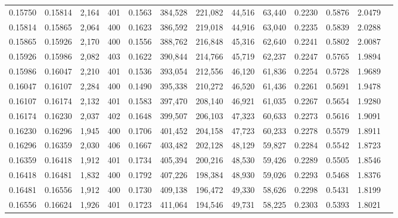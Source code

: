\begin{tabular}{rrrrrrrrrrrrr}
0.15750 & 0.15814 & 2,164 & 401 &                                     0.1563 & 384,528 & 221,082 &  44,516 &  63,440 & 0.2230 & 0.5876 & 2.0479 \\
0.15814 & 0.15865 & 2,064 & 400 &                                     0.1623 & 386,592 & 219,018 &  44,916 &  63,040 & 0.2235 & 0.5839 & 2.0288 \\
0.15865 & 0.15926 & 2,170 & 400 &                                     0.1556 & 388,762 & 216,848 &  45,316 &  62,640 & 0.2241 & 0.5802 & 2.0087 \\
0.15926 & 0.15986 & 2,082 & 403 &                                     0.1622 & 390,844 & 214,766 &  45,719 &  62,237 & 0.2247 & 0.5765 & 1.9894 \\
0.15986 & 0.16047 & 2,210 & 401 &                                     0.1536 & 393,054 & 212,556 &  46,120 &  61,836 & 0.2254 & 0.5728 & 1.9689 \\
0.16047 & 0.16107 & 2,284 & 400 &                                     0.1490 & 395,338 & 210,272 &  46,520 &  61,436 & 0.2261 & 0.5691 & 1.9478 \\
0.16107 & 0.16174 & 2,132 & 401 &                                     0.1583 & 397,470 & 208,140 &  46,921 &  61,035 & 0.2267 & 0.5654 & 1.9280 \\
0.16174 & 0.16230 & 2,037 & 402 &                                     0.1648 & 399,507 & 206,103 &  47,323 &  60,633 & 0.2273 & 0.5616 & 1.9091 \\
0.16230 & 0.16296 & 1,945 & 400 &                                     0.1706 & 401,452 & 204,158 &  47,723 &  60,233 & 0.2278 & 0.5579 & 1.8911 \\
0.16296 & 0.16359 & 2,030 & 406 &                                     0.1667 & 403,482 & 202,128 &  48,129 &  59,827 & 0.2284 & 0.5542 & 1.8723 \\
0.16359 & 0.16418 & 1,912 & 401 &                                     0.1734 & 405,394 & 200,216 &  48,530 &  59,426 & 0.2289 & 0.5505 & 1.8546 \\
0.16418 & 0.16481 & 1,832 & 400 &                                     0.1792 & 407,226 & 198,384 &  48,930 &  59,026 & 0.2293 & 0.5468 & 1.8376 \\
0.16481 & 0.16556 & 1,912 & 400 &                                     0.1730 & 409,138 & 196,472 &  49,330 &  58,626 & 0.2298 & 0.5431 & 1.8199 \\
0.16556 & 0.16624 & 1,926 & 401 &                                     0.1723 & 411,064 & 194,546 &  49,731 &  58,225 & 0.2303 & 0.5393 & 1.8021 \\

\end{tabular}
